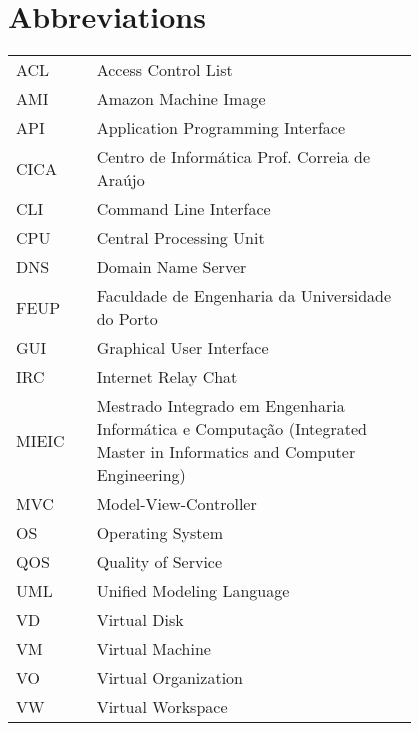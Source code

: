\chapter*{Abbreviations}\label{chap:abbrev}

\begin{flushleft}
\begin{tabular}{l p{0.8\linewidth}}
ACL	 & Access Control List\\
AMI	 & Amazon Machine Image\\
API	 & Application Programming Interface\\
CICA	 & Centro de Informática Prof. Correia de Araújo\\
CLI	 & Command Line Interface\\
CPU	 & Central Processing Unit\\
DNS	 & Domain Name Server\\
FEUP	 & Faculdade de Engenharia da Universidade do Porto\\
GUI	 & Graphical User Interface\\
IRC	 & Internet Relay Chat\\
MIEIC	 & Mestrado Integrado em Engenharia Informática e Computação (Integrated Master in Informatics and Computer Engineering)\\
MVC	 & Model-View-Controller\\
OS	 & Operating System\\
QOS	 & Quality of Service\\
UML	 & Unified Modeling Language\\
VD	 & Virtual Disk\\
VM	 & Virtual Machine\\
VO	 & Virtual Organization\\
VW	 & Virtual Workspace\\
\end{tabular}
\end{flushleft}

